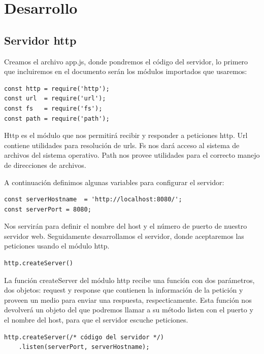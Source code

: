 \documentclass[11pt]{article}
\begin{document}
\section{Desarrollo}
\label{sec:org11739bc}

\subsection{Servidor http}
\label{sec:org3f0dd20}
Creamos el archivo app.js, donde pondremos el código del servidor,
lo primero que incluiremos en el documento serán los módulos importados que usaremos:

\begin{verbatim}
const http = require('http');
const url  = require('url');
const fs   = require('fs');
const path = require('path');
\end{verbatim}

Http es el módulo que nos permitirá recibir y responder a peticiones http.
Url contiene utilidades para resolución de urls.
Fs nos dará acceso al sistema de archivos del sistema operativo.
Path nos provee utilidades para el correcto manejo de direcciones de archivos.

A continuación definimos algunas variables para configurar el servidor:

\begin{verbatim}
const serverHostname  = 'http://localhost:8080/';
const serverPort = 8080;
\end{verbatim}

Nos servirán para definir el nombre del host y el número de puerto de nuestro servidor web.
Seguidamente desarrollamos el servidor, donde aceptaremos las peticiones usando el módulo http.

\begin{verbatim}
http.createServer()
\end{verbatim}

La función createServer del módulo http recibe una función con dos parámetros,
dos objetos: request y response que contienen la información de la petición
y proveen un medio para enviar una respuesta, respecticamente.
Esta función nos devolverá un objeto del que podremos llamar a su método listen con el puerto y el nombre del host,
para que el servidor escuche peticiones.

\begin{verbatim}
http.createServer(/* código del servidor */)
    .listen(serverPort, serverHostname);
\end{verbatim}
\end{document}
